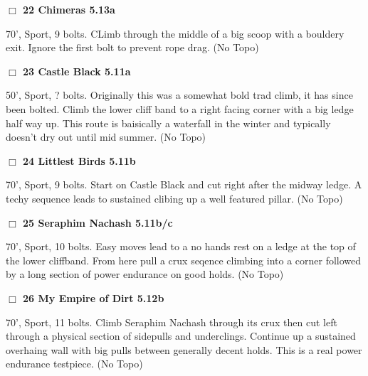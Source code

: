 \begin{multicols}{2}
\needspace{1.5cm}
\label{rt:Chimeras}
\colorbox{Goldenrod!20}{
\parbox{0.95\linewidth}{
\hspace{-1ex}\textbf{$\Box$
22 Chimeras 5.13a  
}}}
\begin{adjustwidth}{1.3em}{}			
70', Sport, 9 bolts. CLimb through the middle of a big scoop with a bouldery exit. Ignore the first bolt to prevent rope drag.
  (No Topo)
\end{adjustwidth}




\needspace{1.5cm}
\label{rt:Castle Black}
\colorbox{RoyalBlue!20}{
\parbox{0.95\linewidth}{
\hspace{-1ex}\textbf{$\Box$
23 Castle Black 5.11a  
}}}
\begin{adjustwidth}{1.3em}{}			
50', Sport, ? bolts. Originally this was a somewhat bold trad climb, it has since been bolted. Climb the lower cliff band to a right facing corner with a big ledge half way up. This route is baisically a waterfall in the winter and typically doesn't dry out until mid summer.
  (No Topo)
\end{adjustwidth}




\needspace{1.5cm}
\label{rt:Littlest Birds}
\colorbox{RoyalBlue!20}{
\parbox{0.95\linewidth}{
\hspace{-1ex}\textbf{$\Box$
24 Littlest Birds 5.11b  
}}}
\begin{adjustwidth}{1.3em}{}			
70', Sport, 9 bolts. Start on Castle Black and cut right after the midway ledge. A techy sequence leads to sustained clibing up a well featured pillar.
  (No Topo)
\end{adjustwidth}




\needspace{1.5cm}
\label{rt:Seraphim Nachash}
\colorbox{RoyalBlue!20}{
\parbox{0.95\linewidth}{
\hspace{-1ex}\textbf{$\Box$
25 Seraphim Nachash 5.11b/c  
}}}
\begin{adjustwidth}{1.3em}{}			
70', Sport, 10 bolts. Easy moves lead to a no hands rest on a ledge at the top of the lower cliffband. From here pull a crux seqence climbing into a corner followed by a long section of power endurance on good holds.
  (No Topo)
\end{adjustwidth}




\needspace{1.5cm}
\label{rt:My Empire of Dirt}
\colorbox{Goldenrod!20}{
\parbox{0.95\linewidth}{
\hspace{-1ex}\textbf{$\Box$
26 My Empire of Dirt 5.12b  
}}}
\begin{adjustwidth}{1.3em}{}			
70', Sport, 11 bolts. Climb Seraphim Nachash through its crux then cut left through a physical section of sidepulls and underclings. Continue up a sustained overhaing wall with big pulls between generally decent holds. This is a real power endurance testpiece.
  (No Topo)
\end{adjustwidth}






\end{multicols}
